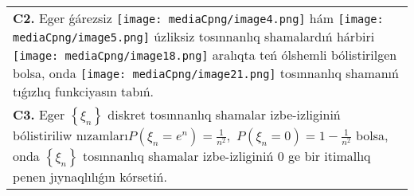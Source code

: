 \documentclass{article}
\begin{document}
\begin{tabular}{m{17cm}}
 \\
\textbf{C2.} Eger ǵárezsiz \texttt{[image: mediaCpng/image4.png]} hám \texttt{[image: mediaCpng/image5.png]} úzliksiz tosınnanlıq shamalardıń hárbiri \texttt{[image: mediaCpng/image18.png]} aralıqta teń ólshemli bólistirilgen bolsa, onda \texttt{[image: mediaCpng/image21.png]} tosınnanlıq shamanıń tıǵızlıq funkciyasın tabıń.
 \\
\textbf{C3.} Eger \(\left\{ \xi_{n} \right\}\) diskret tosınnanlıq shamalar izbe-izliginiń bólistiriliw nızamları\(P(\xi_{n} = e^{n}) = \frac{1}{n^{2}},\) \(P(\xi_{n} = 0) = 1 - \frac{1}{n^{2}}\) bolsa, onda \(\left\{ \xi_{n} \right\}\) tosınnanlıq shamalar izbe-izliginiń 0 ge bir itimallıq penen jıynaqlılıǵın kórsetiń.
 \\

\end{tabular}
\vspace{1cm}
\end{document}
